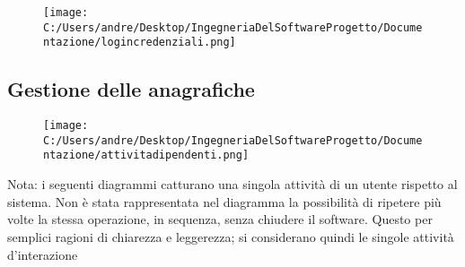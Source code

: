\documentclass[a4paper, oneside, 12pt]{book}
\begin{document}
\begin{figure}[H]
	\centering
	\texttt{[image: C:/Users/andre/Desktop/IngegneriaDelSoftwareProgetto/Documentazione/logincredenziali.png]}
	\label{fig:login credenziali}
\end{figure}

\newpage
\subsection{Gestione delle anagrafiche}

\begin{figure}[H]
	\centering
	\texttt{[image: C:/Users/andre/Desktop/IngegneriaDelSoftwareProgetto/Documentazione/attivitadipendenti.png]}
	\label{fig:attività dipendenti}
\end{figure}

Nota: i seguenti diagrammi catturano una singola attività di un utente rispetto al sistema. Non è stata rappresentata nel diagramma la possibilità di ripetere più volte la stessa operazione, in sequenza, senza chiudere il software. Questo per semplici ragioni di chiarezza e leggerezza; si considerano quindi le singole attività d’interazione
\end{document}
